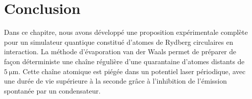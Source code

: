 %
%
%

\section*{Conclusion}
\noindent Dans ce chapitre, nous avons développé une proposition expérimentale complète pour un simulateur quantique constitué d'atomes de Rydberg circulaires en interaction.
La méthode d'\og évaporation van der Waals \fg{} permet de préparer de façon déterministe une chaîne régulière d'une quarantaine d'atomes distants de $\SI{5}{\um}$.
Cette chaîne atomique est piégée dans un potentiel laser périodique, avec une durée de vie supérieure à la seconde grâce à l'inhibition de l'émission spontanée par un condensateur.

